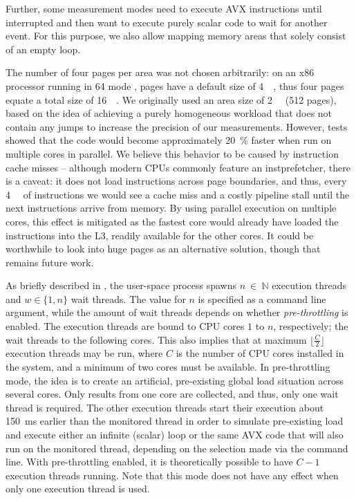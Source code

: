 Further, some measurement modes need to execute \gls{AVX} instructions until interrupted and then want to execute purely scalar code to wait for another event. For this purpose, we also allow mapping memory areas that solely consist of an empty loop.

The number of four pages per area was not chosen arbitrarily: on an x86 processor running in \SI{64}{\bit} mode \cite{intelsdmsysprogguide}, pages have a default size of \SI{4}{\kibi\byte}, thus four pages equate a total size of \SI{16}{\kibi\byte}. We originally used an area size of \SI{2}{\mebi\byte} (512 pages), based on the idea of achieving a purely homogeneous workload that does not contain any jumps to increase the precision of our measurements. However, tests showed that the code would become approximately \SI{20}{\percent} faster when run on multiple cores in parallel. We believe this behavior to be caused by instruction cache misses -- although modern \glspl{CPU} commonly feature an \gls{instprefetcher}, there is a caveat: it does not load instructions across page boundaries, and thus, every \SI{4}{\kibi\byte} of instructions we would see a cache miss and a costly pipeline stall until the next instructions arrive from memory. By using parallel execution on multiple cores, this effect is mitigated as the fastest core would already have loaded the instructions into the \gls{L3}, readily available for the other cores. It could be worthwhile to look into huge pages as an alternative solution, though that remains future work.

As briefly described in , the user-space process spawns $n~\in~\mathbb{N}$ execution threads and $w\in\{1,n\}$ wait threads. The value for $n$ is specified as a command line argument, while the amount of wait threads depends on whether \textit{pre-throttling} is enabled. The execution threads are bound to \gls{CPU} cores $1$ to $n$, respectively; the wait threads to the following cores. This also implies that at maximum $\lfloor{}\frac{C}{2}\rfloor{}$ execution threads may be run, where $C$ is the number of \gls{CPU} cores installed in the system, and a minimum of two cores must be available. In pre-throttling mode, the idea is to create an artificial, pre-existing global load situation across several cores. Only results from one core are collected, and thus, only one wait thread is required. The other execution threads start their execution about \SI{150}{\milli\second} earlier than the monitored thread in order to simulate pre-existing load and execute either an infinite (scalar) loop or the same \gls{AVX} code that will also run on the monitored thread, depending on the selection made via the command line. With pre-throttling enabled, it is theoretically possible to have $C-1$ execution threads running. Note that this mode does not have any effect when only one execution thread is used.

